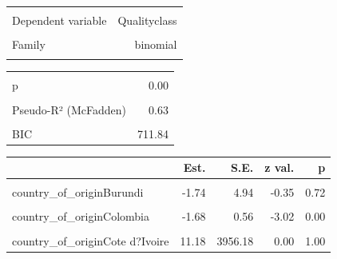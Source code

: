 \documentclass[
  letterpaper,
  DIV=11,
  numbers=noendperiod]{scrartcl}
\begin{document}
\begin{table}[!h]
\centering
\begin{tabular}{lr}
\toprule
\cellcolor{gray!10}{Observations} & \cellcolor{gray!10}{882}\\
Dependent variable & Qualityclass\\
\cellcolor{gray!10}{Type} & \cellcolor{gray!10}{Generalized linear model}\\
Family & binomial\\
\cellcolor{gray!10}{Link} & \cellcolor{gray!10}{logit}\\
\bottomrule
\end{tabular}
\end{table} \begin{table}[!h]
\centering
\begin{tabular}{lr}
\toprule
\cellcolor{gray!10}{$\chi^2$(38)} & \cellcolor{gray!10}{774.22}\\
p & 0.00\\
\cellcolor{gray!10}{Pseudo-R² (Cragg-Uhler)} & \cellcolor{gray!10}{0.78}\\
Pseudo-R² (McFadden) & 0.63\\
\cellcolor{gray!10}{AIC} & \cellcolor{gray!10}{525.33}\\
\addlinespace
BIC & 711.84\\
\bottomrule
\end{tabular}
\end{table} \begin{table}[!h]
\centering
\begin{threeparttable}
\begin{tabular}{lrrrr}
\toprule
  & Est. & S.E. & z val. & p\\
\midrule
\cellcolor{gray!10}{(Intercept)} & \cellcolor{gray!10}{417.93} & \cellcolor{gray!10}{155.81} & \cellcolor{gray!10}{2.68} & \cellcolor{gray!10}{0.01}\\
country\_of\_originBurundi & -1.74 & 4.94 & -0.35 & 0.72\\
\cellcolor{gray!10}{country\_of\_originChina} & \cellcolor{gray!10}{0.20} & \cellcolor{gray!10}{1.02} & \cellcolor{gray!10}{0.19} & \cellcolor{gray!10}{0.85}\\
country\_of\_originColombia & -1.68 & 0.56 & -3.02 & 0.00\\
\cellcolor{gray!10}{country\_of\_originCosta Rica} & \cellcolor{gray!10}{0.03} & \cellcolor{gray!10}{0.71} & \cellcolor{gray!10}{0.05} & \cellcolor{gray!10}{0.96}\\
\addlinespace
country\_of\_originCote d?Ivoire & 11.18 & 3956.18 & 0.00 & 1.00\\

\end{tabular}
\end{threeparttable}
\end{table}
\end{document}
